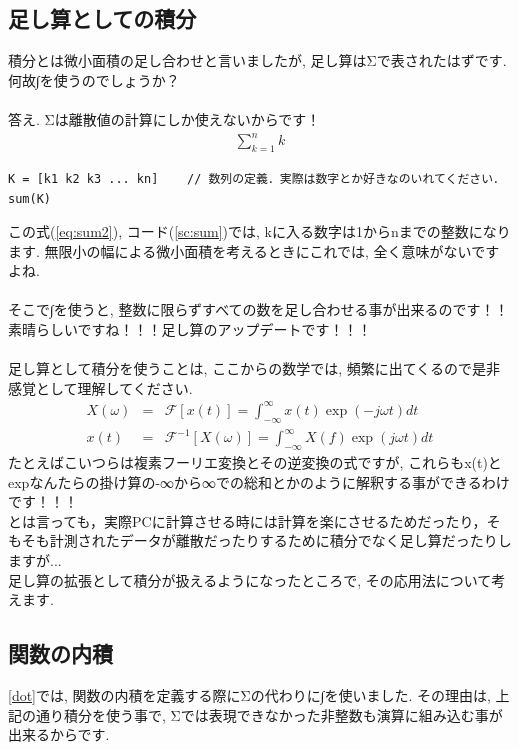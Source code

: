 \documentclass[11pt,a4paper,uplatex]{ujreport}
\begin{document}
\subsection{足し算としての積分}
積分とは微小面積の足し合わせと言いましたが, 足し算はΣで表されたはずです. 何故∫を使うのでしょうか？\\
\\
答え. Σは離散値の計算にしか使えないからです！\\



\begin{eqnarray}
\label{eq:sum2}
\sum_{k=1}^{n} k
\end{eqnarray}

\begin{lstlisting}[caption=\ref{eq:sum}のコード,label=sc:sum,  keepspaces=true]
K = [k1 k2 k3 ... kn]    // 数列の定義．実際は数字とか好きなのいれてください．
sum(K)
\end{lstlisting}


この式(\ref{eq:sum2}), コード(\ref{sc:sum})では, kに入る数字は1からnまでの整数になります. 無限小の幅による微小面積を考えるときにこれでは, 全く意味がないですよね.\\
\\
そこで∫を使うと, 整数に限らずすべての数を足し合わせる事が出来るのです！！\\
素晴らしいですね！！！足し算のアップデートです！！！\\
\\
足し算として積分を使うことは, ここからの数学では, 頻繁に出てくるので是非感覚として理解してください.
\begin{eqnarray}
\label{eq:int3}
X(\omega) &=& \mathcal{F}[x(t)] = \int^{\infty}_{-\infty}x(t)\exp(-j \omega t)dt \\
 x(t) &=& \mathcal{F}^{-1}[X(\omega)] = \int^{\infty}_{-\infty}X(f)\exp(j \omega t)dt 
\end{eqnarray}
たとえばこいつらは複素フーリエ変換とその逆変換の式ですが, これらもx(t)とexpなんたらの掛け算の-∞から∞での総和とかのように解釈する事ができるわけです！！！\\
とは言っても，実際PCに計算させる時には計算を楽にさせるためだったり，そもそも計測されたデータが離散だったりするために積分でなく足し算だったりしますが...\\

足し算の拡張として積分が扱えるようになったところで, その応用法について考えます. 
\subsection{関数の内積 \label{dot_func}}
\ref{dot}では, 関数の内積を定義する際にΣの代わりに∫を使いました. その理由は, 上記の通り積分を使う事で, Σでは表現できなかった非整数も演算に組み込む事が出来るからです.\\
\\
\end{document}
